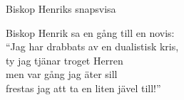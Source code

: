 \begin{song}{Biskop Henriks snapsvisa}
	
	
	
	Biskop Henrik sa en gång till en novis:\\
	``Jag har drabbats av en dualistisk kris,\\
	ty jag tjänar troget Herren\\
	men var gång jag äter sill\\
	frestas jag att ta en liten jävel till!''
	
\end{song}
